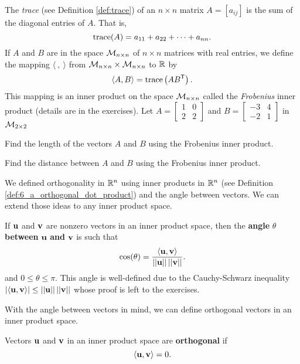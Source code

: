 \begin{activity} \label{act:6_c_Frobenius} The \emph{trace} (see Definition \ref{def:trace}) of an $n \times n$ matrix $A = [a_{ij}]$ is the sum of the diagonal entries of $A$. That is,
\[\text{trace}(A) = a_{11} + a_{22} + \cdots + a_{nn}.\]
If $A$ and $B$ are in the space $\mathcal{M}_{n \times n}$ of $n \times n$ matrices with real entries, we define the mapping $\langle  \ , \ \rangle$ from $\mathcal{M}_{n \times n} \times \mathcal{M}_{n \times n}$ to $\mathbb{R}$ by  
\[\langle A, B \rangle = \text{trace}\left(AB^{\mathsf{T}}\right).\]
This mapping is an inner product on the space $\mathcal{M}_{n \times n}$ called the \emph{Frobenius} inner product (details are in the exercises). Let $A = \left[ \begin{array}{cc} 1&0\\2&2 \end{array} \right]$ and $B = \left[ \begin{array}{rc} -3&4\\-2&1 \end{array} \right]$ in $\mathcal{M}_{2 \times 2}$
\ba
\item Find the length of the vectors $A$ and $B$ using the Frobenius inner product. 
 
 \item Find the distance between $A$ and $B$ using the Frobenius inner product. 
 
 \ea

\end{activity}




\label{sec:inner_prod_orthog}

We defined orthogonality in $\mathbb{R}^n$ using inner products in $\mathbb{R}^n$ (see Definition \ref{def:6_a_orthogonal_dot_product}) and the angle between vectors. We can extend those ideas to any inner product space. 

If $\mathbf{u}$ and $\mathbf{v}$ are nonzero vectors in an inner product space, then the \textbf{angle} $\theta$ \textbf{between} $\mathbf{u}$ \textbf{and} $\mathbf{v}$ is such that 
\[\cos(\theta) = \frac{\langle \mathbf{u}, \mathbf{v} \rangle}{||\mathbf{u}||\, ||\mathbf{v}||}.\]
and $0\leq \theta \leq \pi$. This angle is well-defined due to the Cauchy-Schwarz inequality $|\langle \mathbf{u}, \mathbf{v} \rangle| \leq ||\mathbf{u}||\, ||\mathbf{v}||$ whose proof is left to the exercises.

With the angle between vectors in mind, we can define orthogonal vectors in an inner product space. 

\begin{definition} Vectors $\mathbf{u}$ and $\mathbf{v}$ in an inner product space are \textbf{orthogonal} if
\[\langle \mathbf{u}, \mathbf{v} \rangle = 0.\]
\end{definition}
 
